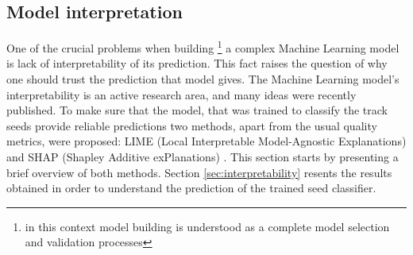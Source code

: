 \subsection{Model interpretation}

One of the crucial problems when building \footnote{in this context model building is understood as a complete model selection and validation processes} a complex Machine Learning model is lack of interpretability of its prediction. This fact raises the question of why one should trust the prediction that model gives. The Machine Learning model's interpretability is an active research area, and many ideas were recently published. To make sure that the model, that was trained to classify the track seeds provide reliable predictions two methods, apart from the usual quality metrics,
were proposed: LIME (Local Interpretable Model-Agnostic Explanations) \cite{lime} and SHAP (Shapley Additive exPlanations) \cite{shap}. This section starts by presenting a brief overview of both methods. Section \ref{sec:interpretability} resents the results obtained in order to understand the prediction of the trained seed classifier.
